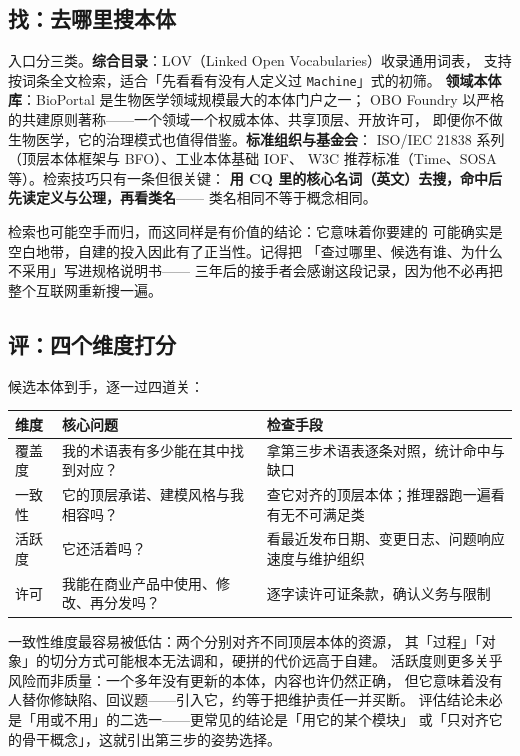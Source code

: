 \subsection{找：去哪里搜本体}

入口分三类。\textbf{综合目录}：LOV（Linked Open Vocabularies）收录通用词表，
支持按词条全文检索，适合「先看看有没有人定义过 \texttt{Machine}」式的初筛。
\textbf{领域本体库}：BioPortal 是生物医学领域规模最大的本体门户之一；
OBO Foundry 以严格的共建原则著称——一个领域一个权威本体、共享顶层、开放许可，
即便你不做生物医学，它的治理模式也值得借鉴。\textbf{标准组织与基金会}：
ISO/IEC 21838 系列（顶层本体框架与 BFO）、工业本体基础 IOF、
W3C 推荐标准（Time、SOSA 等）。检索技巧只有一条但很关键：
\textbf{用 CQ 里的核心名词（英文）去搜，命中后先读定义与公理，再看类名}——
类名相同不等于概念相同。

检索也可能空手而归，而这同样是有价值的结论：它意味着你要建的
可能确实是空白地带，自建的投入因此有了正当性。记得把
「查过哪里、候选有谁、为什么不采用」写进规格说明书——
三年后的接手者会感谢这段记录，因为他不必再把整个互联网重新搜一遍。

\subsection{评：四个维度打分}

候选本体到手，逐一过四道关：

\begin{center}
\begin{tabularx}{\linewidth}{@{}lXX@{}}
\toprule
\textbf{维度} & \textbf{核心问题} & \textbf{检查手段} \\
\midrule
覆盖度 & 我的术语表有多少能在其中找到对应？ & 拿第三步术语表逐条对照，统计命中与缺口 \\
一致性 & 它的顶层承诺、建模风格与我相容吗？ & 查它对齐的顶层本体；推理器跑一遍看有无不可满足类 \\
活跃度 & 它还活着吗？ & 看最近发布日期、变更日志、问题响应速度与维护组织 \\
许可 & 我能在商业产品中使用、修改、再分发吗？ & 逐字读许可证条款，确认义务与限制 \\
\bottomrule
\end{tabularx}
\end{center}

一致性维度最容易被低估：两个分别对齐不同顶层本体的资源，
其「过程」「对象」的切分方式可能根本无法调和，硬拼的代价远高于自建。
活跃度则更多关乎风险而非质量：一个多年没有更新的本体，内容也许仍然正确，
但它意味着没有人替你修缺陷、回议题——引入它，约等于把维护责任一并买断。
评估结论未必是「用或不用」的二选一——更常见的结论是「用它的某个模块」
或「只对齐它的骨干概念」，这就引出第三步的姿势选择。

